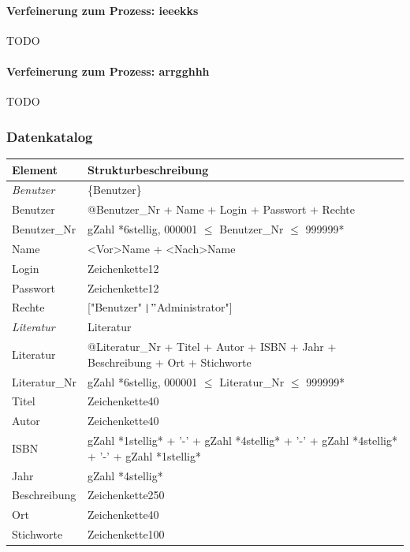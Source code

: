 \paragraph{Verfeinerung zum Prozess: ieeekks}
TODO

\paragraph{Verfeinerung zum Prozess: arrgghhh}
TODO

\subsubsection{Datenkatalog}
\begin{tabular}[ht]{|l|l|}
\hline
Element & Strukturbeschreibung \\
\hline\hline
\emph{Benutzer} & \{Benutzer\} \\
\hline
Benutzer  & @Benutzer\_Nr + Name + Login + Passwort + Rechte \\
\hline
Benutzer\_Nr & gZahl *6stellig, 000001 $\leq$ Benutzer\_Nr $\leq$ 999999* \\ 
\hline
Name & <Vor>Name + <Nach>Name \\
\hline
Login & Zeichenkette12 \\
\hline
Passwort & Zeichenkette12 \\
\hline
Rechte & ["Benutzer" $\mid "$Administrator"] \\
\hline\hline

\emph{Literatur} & {Literatur} \\
\hline
Literatur & @Literatur\_Nr + Titel + Autor + ISBN + Jahr + Beschreibung + Ort + Stichworte \\
\hline
Literatur\_Nr & gZahl *6stellig, 000001 $\leq$ Literatur\_Nr $\leq$ 999999* \\
\hline
Titel & Zeichenkette40 \\
\hline
Autor & Zeichenkette40 \\
\hline
ISBN & gZahl *1stellig* + '-' + gZahl *4stellig* + '-' + gZahl *4stellig* + '-' + gZahl *1stellig* \\
\hline
Jahr & gZahl *4stellig* \\
\hline
Beschreibung & Zeichenkette250 \\
\hline
Ort & Zeichenkette40 \\
\hline
Stichworte & Zeichenkette100 \\
\hline\hline


\end{tabular}
